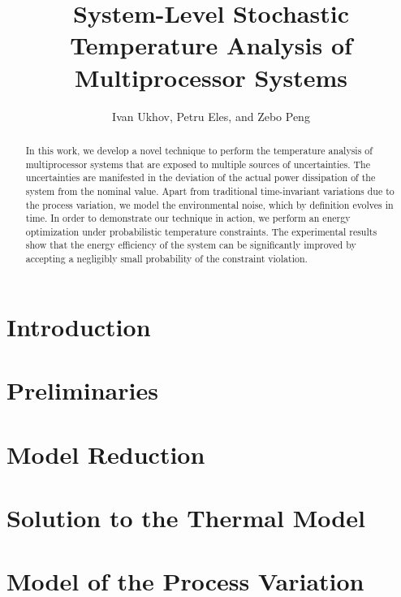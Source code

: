 \documentclass[conference]{IEEEtran}
\begin{document}
  \title{System-Level Stochastic Temperature Analysis of Multiprocessor Systems}
  \author{Ivan Ukhov, Petru Eles, and Zebo Peng}

  \maketitle

  \begin{abstract}
    In this work, we develop a novel technique to perform the temperature analysis of multiprocessor systems that are exposed to multiple sources of uncertainties. The uncertainties are manifested in the deviation of the actual power dissipation of the system from the nominal value. Apart from traditional time-invariant variations due to the process variation, we model the environmental noise, which by definition evolves in time. In order to demonstrate our technique in action, we perform an energy optimization under probabilistic temperature constraints. The experimental results show that the energy efficiency of the system can be significantly improved by accepting a negligibly small probability of the constraint violation.
  \end{abstract}

  \section{Introduction}  
  

  \section{Preliminaries}
  

  \section{Model Reduction} 
  

  \section{Solution to the Thermal Model} 
  

  \section{Model of the Process Variation} 
  
\end{document}
